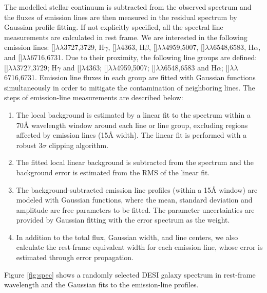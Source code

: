 \documentclass[twocolumn]{aastex631}
\newcommand{\Ha}{\mbox{H$\alpha$}}      %
\newcommand{\Hb}{\mbox{H$\beta$}}       %
\newcommand{\Hg}{\mbox{H$\gamma$}}      %
\newcommand{\SII}{[\mbox{\ion{S}{2}}]}    %
\newcommand{\OIII}{[\mbox{\ion{O}{3}}]}   %
\newcommand{\NII}{[\mbox{\ion{N}{2}}]}   %
\newcommand{\OIIIFOT}{[\mbox{\ion{O}{3}}]$\lambda$4363}
\newcommand{\OII}{[\mbox{\ion{O}{2}}]}    %
\newcommand{\boldtext}[1]{\textcolor[rgb]{0,0,0}{#1}}
\begin{document}

The modelled stellar continuum is subtracted from the observed spectrum and the fluxes of emission lines are then measured in the residual spectrum by Gaussian profile fitting. If not explicitly specified, all the spectral line measurements are calculated in rest frame. We are interested in the following emission lines: {\OII${\lambda\lambda}$3727,3729}, {\Hg}, {\OIIIFOT}, {\Hb}, {\OIII$\lambda\lambda$4959,5007}, {\NII${\lambda\lambda}$6548,6583}, {\Ha}, and {\SII${\lambda\lambda}$6716,6731}. Due to their proximity, the following line groups are defined: {\OII${\lambda\lambda}$3727,3729}; {\Hg} and {\OIIIFOT}; {\OIII$\lambda\lambda$4959,5007}; {\NII${\lambda\lambda}$6548,6583} and {\Ha}; {\SII${\lambda\lambda}$6716,6731}. Emission line fluxes in each group are fitted with Gaussian functions simultaneously in order to mitigate the contamination of neighboring lines. The steps of emission-line measurements are described below: %
\begin{enumerate}
\item The local background is estimated by a linear fit to the spectrum within a 70{\AA} wavelength window around each line or line group, excluding regions affected by emission lines (15{\AA} width). The linear fit is performed with a robust 3$\sigma$ clipping algorithm. 
\item The fitted local linear background is subtracted from the spectrum and the background error is estimated from the RMS of the linear fit.  
\item The background-subtracted emission line profiles (within a 15{\AA} window) are modeled with Gaussian functions, where the mean, standard deviation and amplitude are free parameters to be fitted. The parameter uncertainties are provided by Gaussian fitting with the error spectrum as the weight. 
\item In addition to the total flux, Gaussian width, and line centers, we also calculate the rest-frame equivalent width for each emission line, whose error is estimated through error propagation.
\end{enumerate}
Figure \ref{fig:spec} shows \boldtext{a randomly selected DESI galaxy spectrum} in rest-frame wavelength and the Gaussian fits to the emission-line profiles. 
\end{document}
